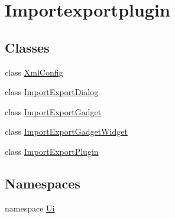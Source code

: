 \hypertarget{group__importexportplugin}{\section{\-Importexportplugin}
\label{group__importexportplugin}
}
\subsection*{\-Classes}
\begin{DoxyCompactItemize}
\item 
class \hyperlink{class_xml_config}{\-Xml\-Config}
\item 
class \hyperlink{class_import_export_dialog}{\-Import\-Export\-Dialog}
\item 
class \hyperlink{class_import_export_gadget}{\-Import\-Export\-Gadget}
\item 
class \hyperlink{class_import_export_gadget_widget}{\-Import\-Export\-Gadget\-Widget}
\item 
class \hyperlink{class_import_export_plugin}{\-Import\-Export\-Plugin}
\end{DoxyCompactItemize}
\subsection*{\-Namespaces}
\begin{DoxyCompactItemize}
\item 
namespace \hyperlink{namespace_ui}{\-Ui}
\end{DoxyCompactItemize}
